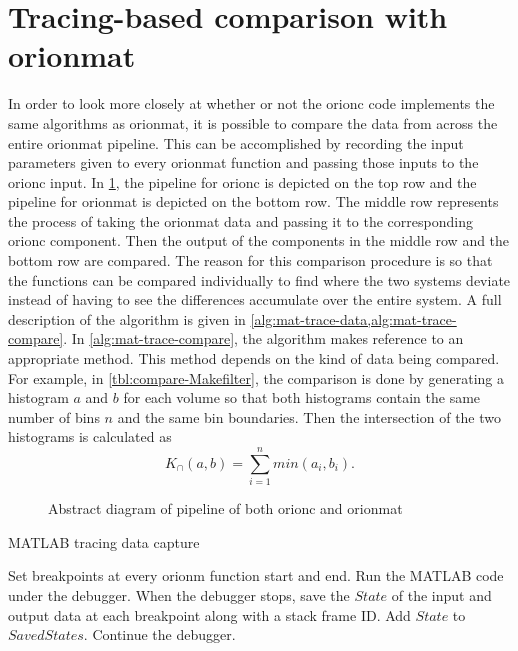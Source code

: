 \section{Tracing-based comparison with \gls{orionmat}}

In order to look more closely at whether or not the \gls{orionc}
code implements the same algorithms as \gls{orionmat}, it is
possible to compare the data from across the entire \gls{orionmat}
pipeline. This can be accomplished by recording the input
parameters given to every \gls{orionmat} function and passing
those inputs to the \gls{orionc} input. In \cref{fig:abs-pipe},
the pipeline for \gls{orionc} is depicted on the top row and the
pipeline for \gls{orionmat} is depicted on the bottom row. The
middle row represents the process of taking the \gls{orionmat}
data and passing it to the corresponding \gls{orionc} component.
Then the output of the components in the middle row and the bottom
row are compared. The reason for this comparison procedure is so
that the functions can be compared individually to find where the
two systems deviate instead of having to see the differences
accumulate over the entire system. A full description of the
algorithm is given in
\cref{alg:mat-trace-data,alg:mat-trace-compare}. In
\cref{alg:mat-trace-compare}, the algorithm makes reference to an
appropriate method. This method depends on the kind of data being
compared. For example, in \cref{tbl:compare-Makefilter}, the
comparison is done by generating a histogram \(a\) and \(b\) for
each volume so that both histograms contain the same number of
bins \(n\) and the same bin boundaries. Then the intersection of the two
histograms is calculated as
\[ K_{\cap}(a, b) = \sum_{i = 1}^{n} min( a_i, b_i ). \]

\begin{figure}
	\centering
	\resizebox{0.8\linewidth}{!}{}
	\caption{Abstract diagram of pipeline of both \gls{orionc}
		and \gls{orionmat}}\label{fig:abs-pipe}
\end{figure}

\begin{algorithm}
	\caption{MATLAB tracing data capture}\label{alg:mat-trace-data}
	\begin{algorithmic}[1]
		\State Set breakpoints at every \gls{orionm} function start and end.
		\State Run the MATLAB code under the debugger.
			\State When the debugger stops, save the $State$ of the input and output data at
				each breakpoint along with a stack frame
				ID. Add $State$ to $SavedStates$.
			\State Continue the debugger.
		\EndWhile
	\end{algorithmic}
\end{algorithm}

